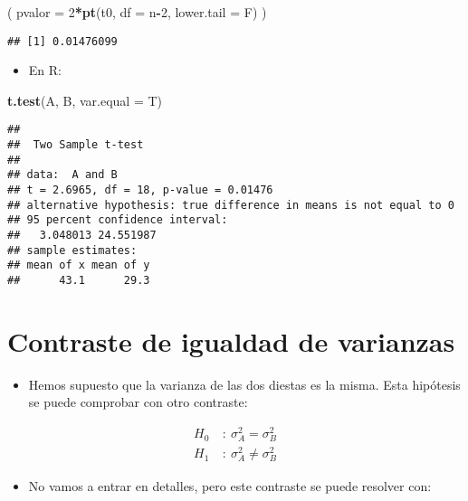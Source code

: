 \documentclass[]{article}
\newenvironment{Shaded}{\begin{snugshade}}{\end{snugshade}}
\newcommand{\KeywordTok}[1]{\textcolor[rgb]{0.13,0.29,0.53}{\textbf{#1}}}
\newcommand{\DataTypeTok}[1]{\textcolor[rgb]{0.13,0.29,0.53}{#1}}
\newcommand{\DecValTok}[1]{\textcolor[rgb]{0.00,0.00,0.81}{#1}}
\newcommand{\OperatorTok}[1]{\textcolor[rgb]{0.81,0.36,0.00}{\textbf{#1}}}
\newcommand{\NormalTok}[1]{#1}
\providecommand{\tightlist}{%
  \setlength{\itemsep}{0pt}\setlength{\parskip}{0pt}}
\begin{document}
\begin{Shaded}
\begin{Highlighting}[]
\NormalTok{( }\DataTypeTok{pvalor =} \DecValTok{2}\OperatorTok{*}\KeywordTok{pt}\NormalTok{(t0, }\DataTypeTok{df =}\NormalTok{ n}\OperatorTok{-}\DecValTok{2}\NormalTok{, }\DataTypeTok{lower.tail =}\NormalTok{ F) )}
\end{Highlighting}
\end{Shaded}

\begin{verbatim}
## [1] 0.01476099
\end{verbatim}

\begin{itemize}
\tightlist
\item
  En R:
\end{itemize}

\begin{Shaded}
\begin{Highlighting}[]
\KeywordTok{t.test}\NormalTok{(A, B, }\DataTypeTok{var.equal =}\NormalTok{ T)}
\end{Highlighting}
\end{Shaded}

\begin{verbatim}
## 
##  Two Sample t-test
## 
## data:  A and B
## t = 2.6965, df = 18, p-value = 0.01476
## alternative hypothesis: true difference in means is not equal to 0
## 95 percent confidence interval:
##   3.048013 24.551987
## sample estimates:
## mean of x mean of y 
##      43.1      29.3
\end{verbatim}

\section{Contraste de igualdad de
varianzas}\label{contraste-de-igualdad-de-varianzas}

\begin{itemize}
\tightlist
\item
  Hemos supuesto que la varianza de las dos diestas es la misma. Esta
  hipótesis se puede comprobar con otro contraste:
\end{itemize}

\[
\begin{align}
H_0 \ & : \ \sigma_A^2 = \sigma_B^2 \\
H_1 \ & : \ \sigma_A^2 \neq \sigma_B^2
\end{align}
\]

\begin{itemize}
\tightlist
\item
  No vamos a entrar en detalles, pero este contraste se puede resolver
  con:
\end{itemize}
\end{document}
